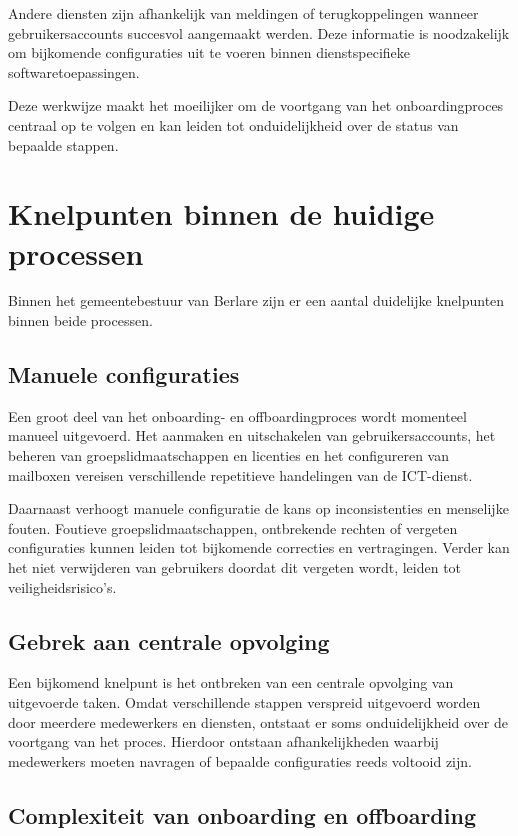 Andere diensten zijn afhankelijk van meldingen of terugkoppelingen wanneer gebruikersaccounts succesvol aangemaakt werden. Deze informatie is noodzakelijk om bijkomende configuraties uit te voeren binnen dienstspecifieke softwaretoepassingen.

Deze werkwijze maakt het moeilijker om de voortgang van het onboardingproces centraal op te volgen en kan leiden tot onduidelijkheid over de status van bepaalde stappen.

\section{Knelpunten binnen de huidige processen}

Binnen het gemeentebestuur van Berlare zijn er een aantal duidelijke knelpunten binnen beide processen.

\subsection{Manuele configuraties}

Een groot deel van het onboarding- en offboardingproces wordt momenteel manueel uitgevoerd. Het aanmaken en uitschakelen van gebruikersaccounts, het beheren van groepslidmaatschappen en licenties en het configureren van mailboxen vereisen verschillende repetitieve handelingen van de ICT-dienst.

Daarnaast verhoogt manuele configuratie de kans op inconsistenties en menselijke fouten. Foutieve groepslidmaatschappen, ontbrekende rechten of vergeten configuraties kunnen leiden tot bijkomende correcties en vertragingen. Verder kan het niet verwijderen van gebruikers doordat dit vergeten wordt, leiden tot veiligheidsrisico's.

\subsection{Gebrek aan centrale opvolging}

Een bijkomend knelpunt is het ontbreken van een centrale opvolging van uitgevoerde taken. Omdat verschillende stappen verspreid uitgevoerd worden door meerdere medewerkers en diensten, ontstaat er soms onduidelijkheid over de voortgang van het proces. Hierdoor ontstaan afhankelijkheden waarbij medewerkers moeten navragen of bepaalde configuraties reeds voltooid zijn.

\subsection{Complexiteit van onboarding en offboarding}

